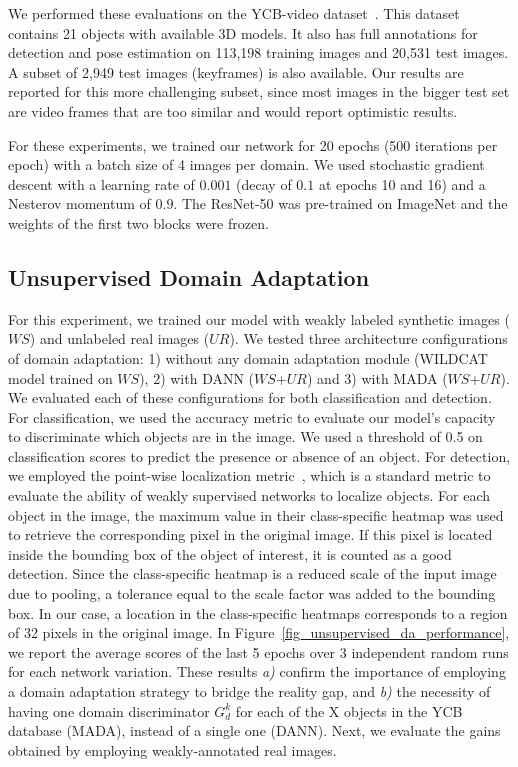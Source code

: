 \documentclass[letterpaper, 10 pt, conference]{ieeeconf}  %
\newcommand{\jp}[1]{\textcolor{orange}{#1}}
\begin{document}
We performed these evaluations on the YCB-video dataset~\cite{xiang2017posecnn}. This dataset contains 21 objects with available 3D models. It also has full annotations for detection and pose estimation on 113,198 training images and 20,531 test images. A subset of 2,949 test images (keyframes) is also available. Our results are reported for this more challenging subset, since most images in the bigger test set are video frames that are too similar and would report optimistic results.

For these experiments, we trained our network for 20 epochs (500 iterations per epoch) with a batch size of 4 images per domain. We used stochastic gradient descent with a learning rate of $0.001$ (decay of $0.1$ at epochs 10 and 16) and a Nesterov momentum of $0.9$. The ResNet-50 was pre-trained on ImageNet and the weights of the first two blocks were frozen.

\subsection{Unsupervised Domain Adaptation}\label{UnsupervisedDA}
For this experiment, we trained our model with weakly labeled synthetic images ($WS$) and unlabeled real images ($UR$). %
We tested three architecture configurations of domain adaptation: 1) without any domain adaptation module (WILDCAT model trained on $WS$), 2) with DANN ($WS$+$UR$) and 3) with MADA ($WS$+$UR$). We evaluated each of these configurations for both classification and detection. For classification, we used the accuracy metric to evaluate our model's capacity to discriminate which objects are in the image. We used a threshold of 0.5 on classification scores to predict the presence or absence of an object. For detection, we employed the point-wise localization metric~\cite{oquab2015object}, which is a standard metric to evaluate the ability of weakly supervised networks to localize objects. For each object in the image, the maximum value in their class-specific heatmap was used to retrieve the corresponding pixel in the original image. If this pixel is located inside the bounding box of the object of interest, it is counted as a good detection. Since the class-specific heatmap is a reduced scale of the input image due to pooling, a tolerance equal to the scale factor was added to the bounding box. In our case, a location in the class-specific heatmaps corresponds to a region of 32 pixels in the original image.
In Figure~\ref{fig_unsupervised_da_performance}, we report the average scores of the last 5 epochs over 3 independent random runs for each network variation. %
These results \emph{a)} confirm the importance of employing a domain adaptation strategy to bridge the reality gap, and \emph{b)} the necessity of having one domain discriminator $G_d^k$ for each of the X objects in the YCB database (MADA), instead of a single one (DANN). Next, we evaluate the gains obtained by employing weakly-annotated real images.
\end{document}
